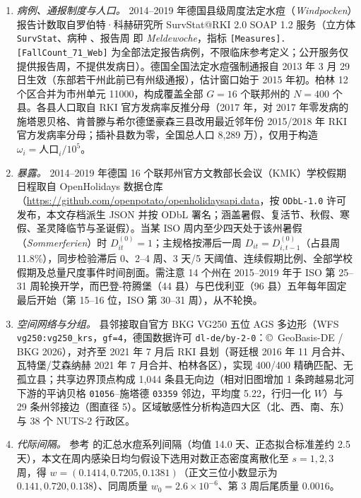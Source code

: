 \documentclass[11pt,a4paper]{ctexart}
\theoremstyle{definition}
\begin{document}
\begin{enumerate}
\item \emph{病例、通报制度与人口。} 2014--2019 年德国县级周度法定水痘（\emph{Windpocken}）报告计数取自罗伯特·科赫研究所 SurvStat@RKI 2.0 SOAP 1.2 服务\citep{faensen2006survnet}（立方体 \texttt{SurvStat}、病种 、报告周  即 \emph{Meldewoche}，指标 \texttt{[Measures].[FallCount\_71\_Web]} 为全部法定报告病例，不限临床参考定义；公开服务仅提供报告周，不提供发病日）。德国全国法定水痘强制通报自 2013 年 3 月 29 日生效（东部若干州此前已有州级通报），估计窗口始于 2015 年初。柏林 12 个区合并为市州单元 11000，构成覆盖全部 $G=16$ 个联邦州的 $N=400$ 个县。各县人口取自 RKI 官方发病率反推分母（2017 年，对 2017 年零发病的施塔恩贝格、肯普滕与希尔德堡豪森三县改用最近邻年份 2015/2018 年 RKI 官方发病率分母；插补县数为零，全国总人口 8,289 万），仅用于构造 $\omega_i=\text{人口}_i/10^5$。
\item \emph{暴露。} 2014--2019 年德国 16 个联邦州官方文教部长会议（KMK）学校假期日程取自 OpenHolidays 数据仓库（\url{https://github.com/openpotato/openholidaysapi.data}，按 \texttt{ODbL-1.0} 许可发布，本文存档派生 JSON 并按 ODbL 署名；涵盖暑假、复活节、秋假、寒假、圣灵降临节与圣诞假）。当某 ISO 周内至少四天处于该州暑假（\emph{Sommerferien}）时 $D^{(0)}_{it}=1$；主规格按滞后一周 $D_{it}=D^{(0)}_{i,t-1}$（占县周 11.8\%），同步检验滞后 0、2--4 周、3 天/5 天阈值、连续假期比例、全部学校假期及总量尺度事件时间剖面。需注意 14 个州在 2015--2019 年于 ISO 第 25--31 周轮换开学，而巴登-符腾堡（44 县）与巴伐利亚（96 县）五年每年固定最后开始（第 15--16 位，ISO 第 30--31 周），从不轮换。
\item \emph{空间网络与分组。} 县邻接取自官方 BKG VG250 五位 AGS 多边形（WFS \texttt{vg250:vg250\_krs}，\texttt{gf=4}，德国数据许可 \texttt{dl-de/by-2-0}：\copyright\ GeoBasis-DE / BKG 2026），对齐至 2021 年 7 月后 RKI 县划（哥廷根 2016 年 11 月合并、瓦特堡/艾森纳赫 2021 年 7 月合并、柏林各区），实现 400/400 精确匹配、无孤立县；共享边界顶点构成 1,044 条县无向边（相对旧图增加 1 条跨越易北河下游的平讷贝格 \texttt{01056}--施塔德 \texttt{03359} 邻边，平均度 5.22，行归一化 $W$）与 29 条州邻接边（图直径 5）。区域敏感性分析构造四大区（北、西、南、东）与 38 个 NUTS-2 行政区。
\item \emph{代际间隔。} 参考\citet{vink2014serial} 的汇总水痘系列间隔（均值 14.0 天、正态拟合标准差约 2.5 天），本文在周内感染日均匀假设下选用对数正态密度离散化至 $s=1,2,3$ 周，得 $w=(0.1414,0.7205,0.1381)$（正文三位小数显示为 $0.141,0.720,0.138$）、同周质量 $w_0=2.6\times 10^{-6}$、第 3 周后尾质量 $0.0016$。
\end{enumerate}
\end{document}
